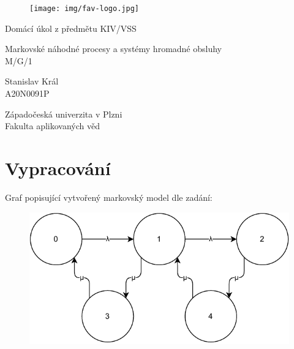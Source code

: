 \documentclass[12pt, a4paper]{article}
\let\oldsection\section
\renewcommand\section{\clearpage\oldsection}
\begin{document}
	\renewcommand{\lstlistingname}{Ukázka kódu}
	\renewcommand{\lstlistlistingname}{Seznam ukázek kódu}
    \begin{titlepage}

        \centering

        \vspace*{\baselineskip}
        \begin{figure}[H]
        \centering
        \texttt{[image: img/fav-logo.jpg]}
        \end{figure}

        \vspace*{1\baselineskip}

        \vspace{0.75\baselineskip}

        \vspace{0.5\baselineskip}
        {Domácí úkol z předmětu KIV/VSS}

        {\LARGE\sc Markovské náhodné procesy a systémy hromadné obsluhy\\}
        {\sc M/G/1\\}

        \vspace{4\baselineskip}

        \vspace{0.5\baselineskip}

        {\sc\Large Stanislav Král \\}
        \vspace{0.5\baselineskip}
        {A20N0091P}

        \vfill

        {\sc Západočeská univerzita v Plzni\\
        Fakulta aplikovaných věd}

    \end{titlepage}

    \tableofcontents
    \pagebreak

\section{Vypracování}

Graf popisující vytvořený markovský model dle zadání:

\begin{figure}[!ht]
    \centering
    \includegraphics[width=.95\linewidth]{pdf/graph.pdf}
    \label{fig:test1}
\end{figure}
\end{document}
